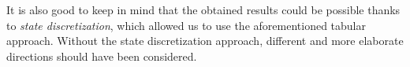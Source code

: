 \\
\\
It is also good to keep in mind that the obtained results could be possible thanks to \textit{state discretization}, which allowed us to use the aforementioned tabular approach.
Without the state discretization approach, different and more elaborate directions should have been considered. 


